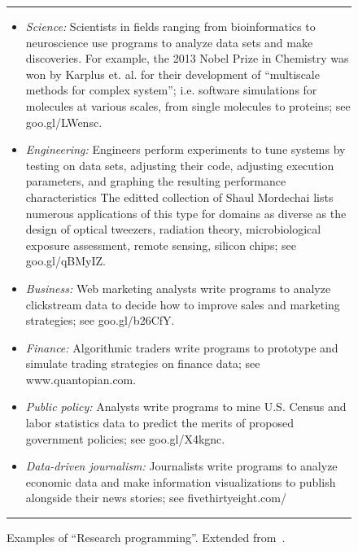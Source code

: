 \documentclass[journal]{IEEEtran}
\newcommand{\bi}{\begin{itemize}}
\newcommand{\ei}{\end{itemize}}
\begin{document}
\begin{figure}[!t]
\small
\hrule

\bi
\item 
{\em Science:} Scientists in fields ranging from bioinformatics to neuroscience use programs to analyze data sets and make  discoveries.
For example, the 2013 Nobel Prize in Chemistry was won by Karplus et. al. for their development of ``multiscale methods for complex system'';
i.e. software simulations for molecules at various scales, from single molecules to proteins; see goo.gl/LWensc.
\item
{\em Engineering:} Engineers perform experiments to tune systems by testing on data sets, adjusting their code, adjusting execution parameters, and graphing the resulting performance characteristics The editted collection of Shaul Mordechai lists numerous applications of this type for domains as diverse as the design of optical tweezers, radiation theory, microbiological exposure assessment, remote sensing, silicon chips; see  goo.gl/qBMyIZ.
\item
{\em Business:} Web marketing analysts write programs to analyze clickstream data to decide how to improve sales and marketing strategies; see  goo.gl/b26CfY.
\item
{\em Finance:} Algorithmic traders write programs to prototype and simulate  trading strategies on finance data; see  www.quantopian.com.
\item
{\em Public policy:} Analysts write programs to mine U.S. Census and labor statistics data to predict the merits of proposed government policies; see goo.gl/X4kgnc.
\item
{\em Data-driven journalism: }Journalists write programs to analyze economic data and make information visualizations to publish alongside their news stories; 
see fivethirtyeight.com/
\ei
\hrule
\caption{Examples of ``Research programming''.
Extended 
from~\cite{guo12}.}\label{fig:eg}
\end{figure}


 
\end{document}
